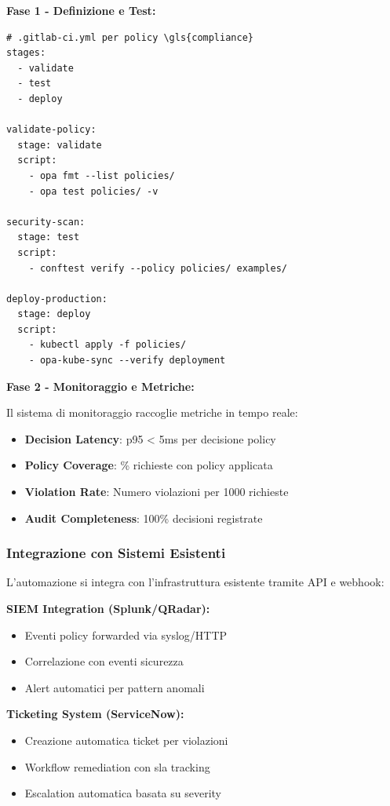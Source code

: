 \textbf{Fase 1 - Definizione e Test:}
\begin{lstlisting}[caption={Pipeline \gls{cicd} per Policy \gls{compliance}},label={lst:cicd_policy}]
# .gitlab-ci.yml per policy \gls{compliance}
stages:
  - validate
  - test
  - deploy

validate-policy:
  stage: validate
  script:
    - opa fmt --list policies/
    - opa test policies/ -v
    
security-scan:
  stage: test
  script:
    - conftest verify --policy policies/ examples/
    
deploy-production:
  stage: deploy
  script:
    - kubectl apply -f policies/
    - opa-kube-sync --verify deployment
\end{lstlisting}

\textbf{Fase 2 - Monitoraggio e Metriche:}

Il sistema di monitoraggio raccoglie metriche in tempo reale:
\begin{itemize}
    \item \textbf{Decision Latency}: p95 < 5ms per decisione policy
    \item \textbf{Policy Coverage}: \% richieste con policy applicata
    \item \textbf{Violation Rate}: Numero violazioni per 1000 richieste
    \item \textbf{Audit Completeness}: 100\% decisioni registrate
\end{itemize}

\subsubsection{Integrazione con Sistemi Esistenti}

L'automazione si integra con l'infrastruttura esistente tramite API e webhook:

\textbf{SIEM Integration (Splunk/QRadar):}
\begin{itemize}
    \item Eventi policy forwarded via syslog/HTTP
    \item Correlazione con eventi sicurezza
    \item Alert automatici per pattern anomali
\end{itemize}

\textbf{Ticketing System (ServiceNow):}
\begin{itemize}
    \item Creazione automatica ticket per violazioni
    \item Workflow remediation con \gls{sla} tracking
    \item Escalation automatica basata su severity
\end{itemize}


